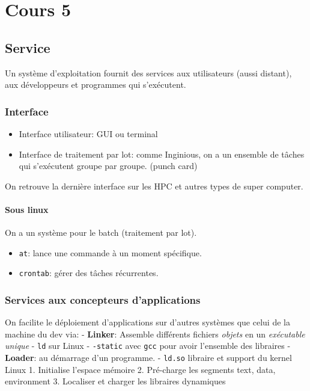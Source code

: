 \section{Cours 5}\label{cours-5}

\subsection{Service}\label{service}

Un système d'exploitation fournit des services aux utilisateurs (aussi
distant), aux développeurs et programmes qui s'exécutent.

\subsubsection{Interface}\label{interface}

\begin{itemize}
\tightlist
\item
  Interface utilisateur: GUI ou terminal
\item
  Interface de traitement par lot: comme Inginious, on a un ensemble de
  tâches qui s'exécutent groupe par groupe. (punch card)
\end{itemize}

On retrouve la dernière interface sur les HPC et autres types de super
computer.

\paragraph{Sous linux}\label{sous-linux}

On a un système pour le batch (traitement par lot).

\begin{itemize}
\tightlist
\item
  \texttt{at}: lance une commande à un moment spécifique.
\item
  \texttt{crontab}: gérer des tâches récurrentes.
\end{itemize}

\subsubsection{Services aux concepteurs
d'applications}\label{services-aux-concepteurs-dapplications}

On facilite le déploiement d'applications sur d'autres systèmes que
celui de la machine du dev via: - \textbf{Linker}: Assemble différents
fichiers \emph{objets} en un \emph{exécutable unique} - \texttt{ld} sur
Linux - \texttt{-static} avec \texttt{gcc} pour avoir l'ensemble des
libraires - \textbf{Loader}: au démarrage d'un programme. -
\texttt{ld.so} libraire et support du kernel Linux 1. Initialise
l'espace mémoire 2. Pré-charge les segments text, data, environment 3.
Localiser et charger les libraires dynamiques

